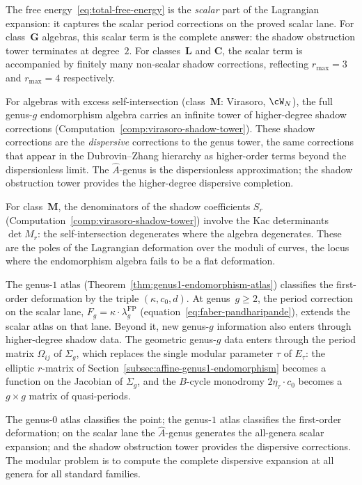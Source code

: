 \begin{remark}%
\label{rem:shadow-corrections-ahat}%
%
The free energy~\eqref{eq:total-free-energy} is the
\emph{scalar} part of the Lagrangian expansion: it
captures the scalar period corrections on the proved
scalar lane. For class~$\mathbf{G}$ algebras,
this scalar term is the complete answer: the shadow obstruction tower
terminates at degree~$2$. For classes~$\mathbf{L}$ and
$\mathbf{C}$, the scalar term is accompanied by finitely
many non-scalar shadow corrections, reflecting
$r_{\max}=3$ and $r_{\max}=4$ respectively.

For algebras with excess self-intersection
(class~$\mathbf{M}$: Virasoro, $\cW_N$), the full
genus-$g$ endomorphism algebra carries an infinite tower
of higher-degree shadow corrections
(Computation~\ref{comp:virasoro-shadow-tower}). These
shadow corrections are the \emph{dispersive}
corrections to the genus tower, the same corrections
that appear in the Dubrovin--Zhang hierarchy as
higher-order terms beyond the dispersionless limit.
The $\hat{A}$-genus is the dispersionless approximation;
the shadow obstruction tower provides the higher-degree dispersive
completion.

For class~$\mathbf{M}$, the denominators of the shadow
coefficients $S_r$
(Computation~\ref{comp:virasoro-shadow-tower}) involve the
Kac determinants $\det M_r$: the self-intersection
degenerates where the algebra degenerates. These
are the poles of the Lagrangian deformation over the
moduli of curves, the locus where the endomorphism
algebra fails to be a flat deformation.
\end{remark}

\begin{remark}%
\label{rem:atlas-continuation}%
%
The genus-$1$ atlas
(Theorem~\ref{thm:genus1-endomorphism-atlas}) classifies
the first-order deformation by the triple
$(\kappa, c_0, d)$. At genus~$g \ge 2$, the period
correction on the scalar lane,
$F_g = \kappa \cdot \lambda_g^{\mathrm{FP}}$ (equation~\eqref{eq:faber-pandharipande}),
extends the scalar atlas on that lane. Beyond it, new
genus-$g$ information also enters through higher-degree
shadow data. The geometric genus-$g$ data
enters through the period matrix $\Omega_{ij}$ of
$\Sigma_g$, which replaces the single modular parameter
$\tau$ of $E_\tau$: the elliptic $r$-matrix of
Section~\ref{subsec:affine-genus1-endomorphism} becomes
a function on the Jacobian of $\Sigma_g$, and the
$B$-cycle monodromy $2\eta_\tau \cdot c_0$ becomes a
$g \times g$ matrix of quasi-periods.

The genus-$0$ atlas classifies the point;
the genus-$1$ atlas classifies the first-order
deformation; on the scalar lane the
$\hat{A}$-genus generates the all-genera scalar
expansion; and the shadow obstruction tower
provides the dispersive corrections. The modular
problem is to compute the complete dispersive
expansion at all genera for all standard families.
\end{remark}

